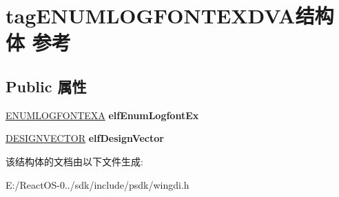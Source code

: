 \hypertarget{structtag_e_n_u_m_l_o_g_f_o_n_t_e_x_d_v_a}{}\section{tag\+E\+N\+U\+M\+L\+O\+G\+F\+O\+N\+T\+E\+X\+D\+V\+A结构体 参考}
\label{structtag_e_n_u_m_l_o_g_f_o_n_t_e_x_d_v_a}
\subsection*{Public 属性}
\begin{DoxyCompactItemize}
\item 
\mbox{\label{structtag_e_n_u_m_l_o_g_f_o_n_t_e_x_d_v_a_a1c7a8e57b2fb7835b0cb765204812545}} 
\hyperlink{structtag_e_n_u_m_l_o_g_f_o_n_t_e_x_a}{E\+N\+U\+M\+L\+O\+G\+F\+O\+N\+T\+E\+XA} {\bfseries elf\+Enum\+Logfont\+Ex}
\item 
\mbox{\label{structtag_e_n_u_m_l_o_g_f_o_n_t_e_x_d_v_a_a125e80aba6c7b0de8519aa7073babfba}} 
\hyperlink{struct___d_e_s_i_g_n_v_e_c_t_o_r}{D\+E\+S\+I\+G\+N\+V\+E\+C\+T\+OR} {\bfseries elf\+Design\+Vector}
\end{DoxyCompactItemize}


该结构体的文档由以下文件生成\+:\begin{DoxyCompactItemize}
\item 
E\+:/\+React\+O\+S-\/0../sdk/include/psdk/wingdi.\+h\end{DoxyCompactItemize}

